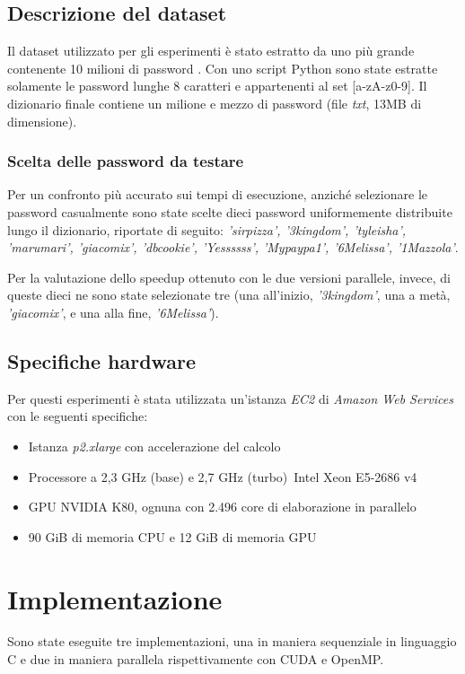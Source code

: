 \documentclass[10pt,twocolumn,letterpaper]{article}
\begin{document}
\subsection{Descrizione del dataset}
Il dataset utilizzato per gli esperimenti è stato estratto da uno più grande contenente 10 milioni di password \cite{DATASET}. Con uno script Python sono state estratte solamente le password lunghe 8 caratteri e appartenenti al set [a-zA-z0-9]. Il dizionario finale contiene un milione e mezzo di password (file \textit{txt}, 13MB di dimensione).
\subsubsection{Scelta delle password da testare}
Per un confronto più accurato sui tempi di esecuzione, anziché selezionare le password casualmente sono state scelte dieci password uniformemente distribuite lungo il dizionario, riportate di seguito: \textit{'sirpizza', '3kingdom', 'tyleisha', 'marumari', 'giacomix', 'dbcookie', 'Yessssss', 'Mypaypa1', '6Melissa', '1Mazzola'}.

Per la valutazione dello speedup ottenuto con le due versioni parallele, invece, di queste dieci ne sono state selezionate tre (una all'inizio, \textit{'3kingdom'}, una a metà, \textit{'giacomix'}, e una alla fine, \textit{'6Melissa'}).

\subsection{Specifiche hardware}
Per questi esperimenti è stata utilizzata un'istanza \textit{EC2} di \textit{Amazon Web Services} con le seguenti specifiche:
\begin{itemize}
\item Istanza \textit{p2.xlarge} con accelerazione del calcolo
\item Processore a 2,3 GHz (base) e 2,7 GHz (turbo) Intel Xeon E5-2686 v4
\item GPU NVIDIA K80, ognuna con 2.496 core di elaborazione in parallelo
\item 90 GiB di memoria CPU e 12 GiB di memoria GPU
\end{itemize} 

\section{Implementazione}
Sono state eseguite tre implementazioni, una in maniera sequenziale in linguaggio C e due in maniera parallela rispettivamente con CUDA e OpenMP.
\end{document}
